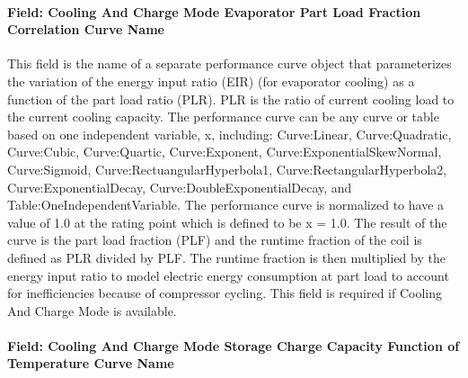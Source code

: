 \paragraph{Field: Cooling And Charge Mode Evaporator Part Load Fraction Correlation Curve Name}\label{field-cooling-and-charge-mode-evaporator-part-load-fraction-correlation-curve-name}

This field is the name of a separate performance curve object that parameterizes the variation of the energy input ratio (EIR) (for evaporator cooling) as a function of the part load ratio (PLR). PLR is the ratio of current cooling load to the current cooling capacity. The performance curve can be any curve or table based on one independent variable, x, including: Curve:Linear, Curve:Quadratic, Curve:Cubic, Curve:Quartic, Curve:Exponent, Curve:ExponentialSkewNormal, Curve:Sigmoid, Curve:RectuangularHyperbola1, Curve:RectangularHyperbola2, Curve:ExponentialDecay, Curve:DoubleExponentialDecay, and Table:OneIndependentVariable. The performance curve is normalized to have a value of 1.0 at the rating point which is defined to be x = 1.0. The result of the curve is the part load fraction (PLF) and the runtime fraction of the coil is defined as PLR divided by PLF. The runtime fraction is then multiplied by the energy input ratio to model electric energy consumption at part load to account for inefficiencies because of compressor cycling. This field is required if Cooling And Charge Mode is available.

\paragraph{Field: Cooling And Charge Mode Storage Charge Capacity Function of Temperature Curve Name}\label{field-cooling-and-charge-mode-storage-charge-capacity-function-of-temperature-curve-name}


